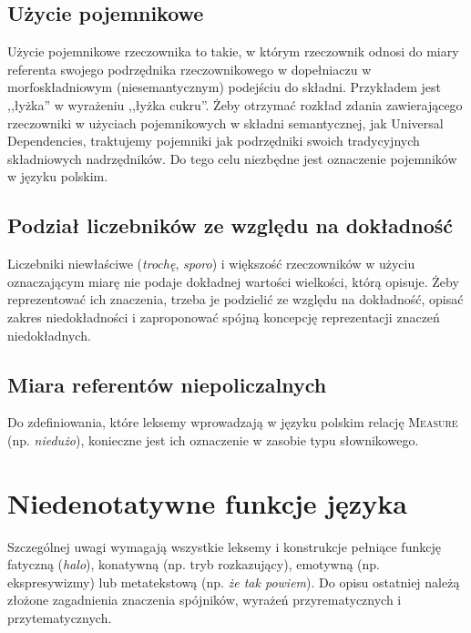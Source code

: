 \documentclass[a4paper, 12pt]{article}
\theoremstyle{remark}
\begin{document}
\subsection{Użycie pojemnikowe} %
\label{pojemniki}
Użycie pojemnikowe rzeczownika to takie, w którym rzeczownik odnosi do miary referenta swojego podrzędnika rzeczownikowego w dopełniaczu w morfoskładniowym (niesemantycznym) podejściu do składni. Przykładem jest ,,łyżka'' w wyrażeniu ,,łyżka cukru''.
Żeby otrzymać rozkład zdania zawierającego rzeczowniki w użyciach pojemnikowych w składni semantycznej, jak Universal Dependencies, traktujemy pojemniki jak podrzędniki swoich tradycyjnych składniowych nadrzędników. Do tego celu niezbędne jest oznaczenie pojemników w języku polskim.


\subsection{Podział liczebników ze względu na dokładność} %

Liczebniki niewłaściwe (\emph{trochę}, \emph{sporo}) i większość rzeczowników w użyciu oznaczającym miarę nie podaje dokładnej wartości wielkości, którą opisuje. Żeby reprezentować ich znaczenia, trzeba je podzielić ze względu na dokładność, opisać zakres niedokładności i zaproponować spójną koncepcję reprezentacji znaczeń niedokładnych.


\subsection{Miara referentów niepoliczalnych} %

Do zdefiniowania, które leksemy wprowadzają w języku polskim relację \textsc{Measure} (np. \emph{niedużo}), konieczne jest ich oznaczenie w zasobie typu słownikowego.



\section{Niedenotatywne funkcje języka} %
Szczególnej uwagi wymagają wszystkie leksemy i konstrukcje pełniące funkcję fatyczną (\emph{halo}), konatywną (np. tryb rozkazujący), emotywną (np. ekspresywizmy) lub metatekstową (np. \emph{że tak powiem}).
Do opisu ostatniej należą złożone zagadnienia znaczenia spójników, wyrażeń przyrematycznych i przytematycznych.
\end{document}

